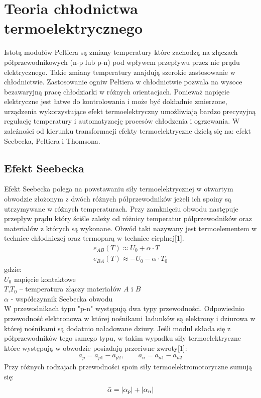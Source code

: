 \documentclass[oneside]{mgr}
\begin{document}
\chapter{Teoria chłodnictwa termoelektrycznego}
Istotą modułów Peltiera są zmiany temperatury które zachodzą na złączach półprzewodnikowych (n-p lub p-n) pod wpływem przepływu przez nie prądu elektrycznego. Takie zmiany temperatury znajdują szerokie zastosowanie w chłodnictwie. Zastosowanie ogniw Peltiera w chłodnictwie pozwala na wysoce bezawaryjną pracę chłodziarki w różnych orientacjach. 
Ponieważ napięcie elektryczne jest łatwe do kontrolowania i może być dokładnie zmierzone, urządzenia wykorzystujące efekt termoelektryczny umożliwiają bardzo precyzyjną regulację temperatury i automatyzację procesów chłodzenia i ogrzewania. W zależności od kierunku transformacji efekty termoelektryczne dzielą się na: efekt Seebecka, Peltiera i Thomsona.

\section{Efekt Seebecka}
Efekt Seebecka polega na powstawaniu siły termoelektrycznej w otwartym obwodzie złożonym z dwóch różnych półprzewodników jeżeli ich spoiny są utrzymywane w różnych temperaturach. Przy zamknięciu obwodu następuje przepływ prądu który ściśle zależy od różnicy temperatur półprzewodników oraz materiałów z których są wykonane. Obwód taki nazywany jest termoelementem w technice chłodniczej oraz termoparą w technice cieplnej[1].
\begin{eqnarray}
    e_{AB}(T) \approx U_0 + \alpha \cdot T\\
    e_{BA}(T) \approx -U_0 -\alpha \cdot T_0 \nonumber
\end{eqnarray}
gdzie: \\
$U_0$ napięcie kontaktowe \\
$T$,$T_0$ – temperatura złączy materiałów $A$ i $B$ \\
$\alpha$ - współczynnik Seebecka obwodu \\

W przewodnikach typu "p-n" występują dwa typy przewodności. Odpowiednio przewodność elektronowa w której nośnikami ładunków są elektrony i dziurowa w której nośnikami są dodatnio naładowane dziury. Jeśli moduł składa się z półprzewodników tego samego typu, w takim wypadku siły termoelektryczne które występują w obwodzie posiadają przeciwne zwroty[1]:
\begin{eqnarray}
    a_p=a_{p1}-a_{p2}, \qquad a_n=a_{n1}-a_{n2}
\end{eqnarray}
Przy różnych rodzajach przewodności spoin siły termoelektromotoryczne sumują się:
\begin{eqnarray}
    \Bar{\alpha}=|\alpha_p|+|\alpha_n|
\end{eqnarray}
\end{document}
